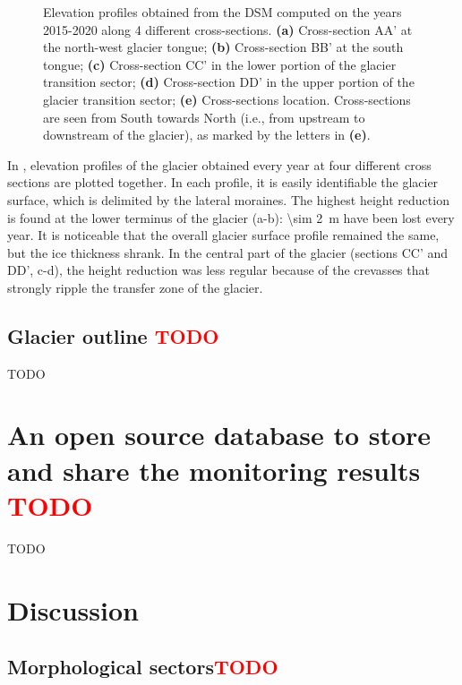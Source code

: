 \begin{figure}
{  }
    \caption{Elevation profiles obtained from the DSM computed on the years 2015-2020 along 4 different cross-sections. \textbf{(a)} Cross-section AA' at the north-west glacier tongue; \textbf{(b)} Cross-section BB' at the south tongue; \textbf{(c)} Cross-section CC' in the lower portion of the glacier transition sector; \textbf{(d)} Cross-section DD' in the upper portion of the glacier transition sector; \textbf{(e)} Cross-sections location. Cross-sections are seen from South towards North (i.e., from upstream to downstream of the glacier), as marked by the letters in \textbf{(e)}.}
    \label{fig:3:profiles}
\end{figure}

In , elevation profiles of the glacier obtained every year at four different cross sections are plotted together.
In each profile, it is easily identifiable the glacier surface, which is delimited by the lateral moraines.
The highest height reduction is found at the lower terminus of the glacier (a-b): \qty{\sim 2}{\meter} have been lost every year. 
It is noticeable that the overall glacier surface profile remained the same, but the ice thickness shrank.
In the central part of the glacier (sections CC' and DD', c-d), the height reduction was less regular because of the crevasses that strongly ripple the transfer zone of the glacier.	

\subsection{Glacier outline \textcolor{red}{TODO}}\label{sec:3:res:outline}

{\color{red} TODO}

\section{An open source database to store and share the monitoring results \textcolor{red}{TODO}}

{\color{red} TODO}

\section{Discussion}\label{sec:3:discussion}

\subsection{Morphological sectors\textcolor{red}{TODO}}\label{sec:3:discussion:sectors}

